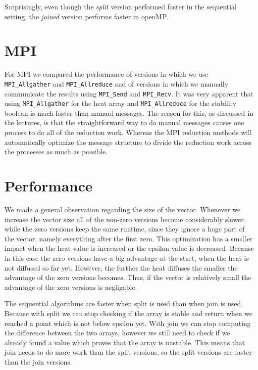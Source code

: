 \documentclass[a4paper]{article}
\begin{document}

Surprisingly, even though the \textit{split} version performed faster in the sequential setting, the \textit{joined} version performs faster in openMP.

\section{MPI}
For MPI we compared the performance of versions in which we use \texttt{MPI\_Allgather}
and \texttt{MPI\_Allreduce} and of versions in which we manually communicate the results using \texttt{MPI\_Send} and \texttt{MPI\_Recv}. It was very apparent that using \texttt{MPI\_Allgather} for the heat array and \texttt{MPI\_Allreduce} for the stability boolean is much faster than manual messages. The reason for this, as discussed in the lectures, 
is that the straightforward way to do manual messages causes one process to do all of the reduction work. Whereas the MPI reduction methods will automatically optimize the message structure to divide the reduction work across the processes as much as possible. 


\section{Performance}
We made a general observation regarding the size of the vector. Whenever we increase the vector size all of the non-zero versions become considerably slower, while the zero versions keep the same runtime, since they ignore a huge part of the vector, namely everything after the first zero. This optimization has a smaller impact when the heat value is increased or the epsilon value is decreased. Because in this case the zero versions have a big advantage at the start, when the heat is not diffused so far yet. However, the further the heat diffuses the smaller the advantage of the zero versions becomes. Thus, if the vector is relatively small the advantage of the zero versions is negligable.

The sequential algorithms are faster when split is used than when join is used. Because with split we can stop checking if the array is stable and return when we reached a point which is not below epsilon yet. With join we can stop computing the difference between the two arrays, however we still need to check if we already found a value which proves that the array is unstable. This means that join needs to do more work than the split versions, so the split versions are faster than the join versions.
\end{document}
